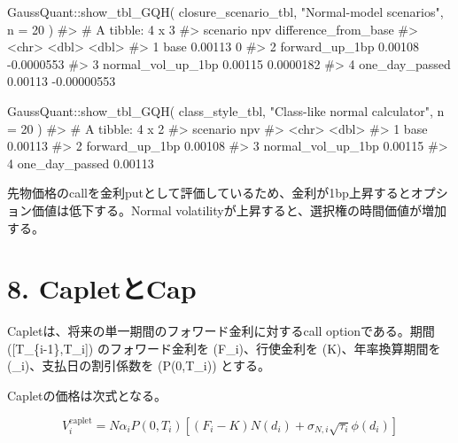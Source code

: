 \documentclass[
  letterpaper,
  DIV=11,
  numbers=noendperiod]{scrreprt}
\newenvironment{Shaded}{\begin{snugshade}}{\end{snugshade}}
\newcommand{\AttributeTok}[1]{\textcolor[rgb]{0.40,0.45,0.13}{#1}}
\newcommand{\CommentTok}[1]{\textcolor[rgb]{0.37,0.37,0.37}{#1}}
\newcommand{\DecValTok}[1]{\textcolor[rgb]{0.68,0.00,0.00}{#1}}
\newcommand{\FunctionTok}[1]{\textcolor[rgb]{0.28,0.35,0.67}{#1}}
\newcommand{\NormalTok}[1]{\textcolor[rgb]{0.00,0.23,0.31}{#1}}
\newcommand{\SpecialCharTok}[1]{\textcolor[rgb]{0.37,0.37,0.37}{#1}}
\newcommand{\StringTok}[1]{\textcolor[rgb]{0.13,0.47,0.30}{#1}}
\begin{document}
\begin{Shaded}
\begin{Highlighting}[]
\NormalTok{GaussQuant}\SpecialCharTok{::}\FunctionTok{show\_tbl\_GQH}\NormalTok{(}
\NormalTok{  closure\_scenario\_tbl,}
  \StringTok{"Normal{-}model scenarios"}\NormalTok{,}
  \AttributeTok{n =} \DecValTok{20}
\NormalTok{)}
\CommentTok{\#\textgreater{} \# A tibble: 4 x 3}
\CommentTok{\#\textgreater{}   scenario              npv difference\_from\_base}
\CommentTok{\#\textgreater{}   \textless{}chr\textgreater{}               \textless{}dbl\textgreater{}                \textless{}dbl\textgreater{}}
\CommentTok{\#\textgreater{} 1 base              0.00113           0         }
\CommentTok{\#\textgreater{} 2 forward\_up\_1bp    0.00108          {-}0.0000553 }
\CommentTok{\#\textgreater{} 3 normal\_vol\_up\_1bp 0.00115           0.0000182 }
\CommentTok{\#\textgreater{} 4 one\_day\_passed    0.00113          {-}0.00000553}

\NormalTok{GaussQuant}\SpecialCharTok{::}\FunctionTok{show\_tbl\_GQH}\NormalTok{(}
\NormalTok{  class\_style\_tbl,}
  \StringTok{"Class{-}like normal calculator"}\NormalTok{,}
  \AttributeTok{n =} \DecValTok{20}
\NormalTok{)}
\CommentTok{\#\textgreater{} \# A tibble: 4 x 2}
\CommentTok{\#\textgreater{}   scenario              npv}
\CommentTok{\#\textgreater{}   \textless{}chr\textgreater{}               \textless{}dbl\textgreater{}}
\CommentTok{\#\textgreater{} 1 base              0.00113}
\CommentTok{\#\textgreater{} 2 forward\_up\_1bp    0.00108}
\CommentTok{\#\textgreater{} 3 normal\_vol\_up\_1bp 0.00115}
\CommentTok{\#\textgreater{} 4 one\_day\_passed    0.00113}
\end{Highlighting}
\end{Shaded}

先物価格のcallを金利putとして評価しているため、金利が1bp上昇するとオプション価値は低下する。Normal
volatilityが上昇すると、選択権の時間価値が増加する。

\section{8. CapletとCap}\label{capletux3068cap}

Capletは、将来の単一期間のフォワード金利に対するcall optionである。期間
({[}T\_\{i-1\},T\_i{]}) のフォワード金利を (F\_i)、行使金利を
(K)、年率換算期間を (\alpha\_i)、支払日の割引係数を (P(0,T\_i)) とする。

Capletの価格は次式となる。

\[
V_i^{\mathrm{caplet}}
=
N\alpha_iP(0,T_i)
\left[
(F_i-K)N(d_i)
+
\sigma_{N,i}\sqrt{\tau_i}\phi(d_i)
\right]
\]
\end{document}
